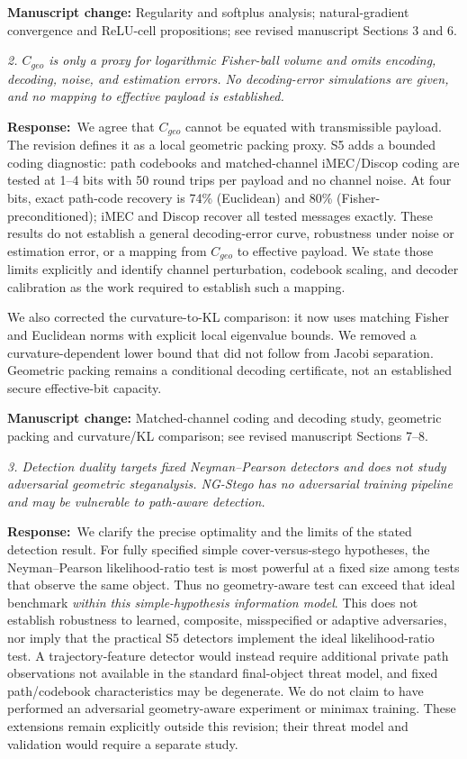 \documentclass[12pt,a4paper]{article}
\newcommand{\revcomment}[1]{\par\medskip\noindent\colorbox{gray!15}{\parbox{\dimexpr\linewidth-2\fboxsep}{\itshape #1}}\par\medskip}
\newcommand{\ourresponse}{\noindent\textbf{Response:}\ }
\newcommand{\manuscriptchange}[1]{\par\smallskip\noindent\textcolor{blue!70!black}{\textbf{Manuscript change:} #1}\par\smallskip}
\begin{document}
\manuscriptchange{Regularity and softplus analysis; natural-gradient convergence and ReLU-cell propositions; see revised manuscript Sections 3 and 6.}

\revcomment{2. $C_{geo}$ is only a proxy for logarithmic Fisher-ball volume and omits encoding, decoding, noise, and estimation errors. No decoding-error simulations are given, and no mapping to effective payload is established.}

\ourresponse We agree that $C_{geo}$ cannot be equated with transmissible payload. The revision defines it as a local geometric packing proxy. S5 adds a bounded coding diagnostic: path codebooks and matched-channel iMEC/Discop coding are tested at 1--4 bits with 50 round trips per payload and no channel noise. At four bits, exact path-code recovery is 74\% (Euclidean) and 80\% (Fisher-preconditioned); iMEC and Discop recover all tested messages exactly. These results do not establish a general decoding-error curve, robustness under noise or estimation error, or a mapping from $C_{geo}$ to effective payload. We state those limits explicitly and identify channel perturbation, codebook scaling, and decoder calibration as the work required to establish such a mapping.

We also corrected the curvature-to-KL comparison: it now uses matching
Fisher and Euclidean norms with explicit local eigenvalue bounds. We
removed a curvature-dependent lower bound that did not follow from
Jacobi separation. Geometric packing remains a conditional decoding
certificate, not an established secure effective-bit capacity.

\manuscriptchange{Matched-channel coding and decoding study, geometric packing and curvature/KL comparison; see revised manuscript Sections 7--8.}

\revcomment{3. Detection duality targets fixed Neyman--Pearson detectors and does not study adversarial geometric steganalysis. NG-Stego has no adversarial training pipeline and may be vulnerable to path-aware detection.}

\ourresponse We clarify the precise optimality and the limits of the stated detection result. For fully specified simple cover-versus-stego hypotheses, the Neyman--Pearson likelihood-ratio test is most powerful at a fixed size among tests that observe the same object. Thus no geometry-aware test can exceed that ideal benchmark \emph{within this simple-hypothesis information model}. This does not establish robustness to learned, composite, misspecified or adaptive adversaries, nor imply that the practical S5 detectors implement the ideal likelihood-ratio test. A trajectory-feature detector would instead require additional private path observations not available in the standard final-object threat model, and fixed path/codebook characteristics may be degenerate. We do not claim to have performed an adversarial geometry-aware experiment or minimax training. These extensions remain explicitly outside this revision; their threat model and validation would require a separate study.
\end{document}
